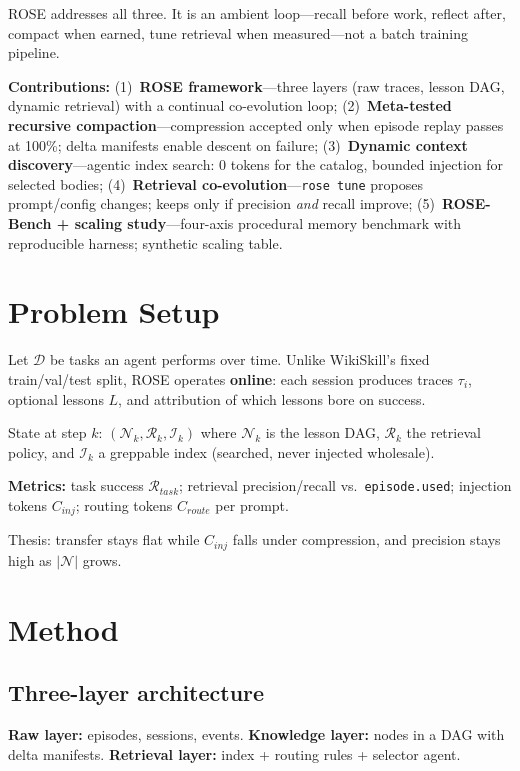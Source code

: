 \documentclass[11pt]{article}
\begin{document}
ROSE addresses all three.
It is an ambient loop---recall before work, reflect after, compact when earned, tune retrieval when measured---not a batch training pipeline.

\textbf{Contributions:}
(1)~\textbf{ROSE framework}---three layers (raw traces, lesson DAG, dynamic retrieval) with a continual co-evolution loop;
(2)~\textbf{Meta-tested recursive compaction}---compression accepted only when episode replay passes at 100\%; delta manifests enable descent on failure;
(3)~\textbf{Dynamic context discovery}---agentic index search: 0 tokens for the catalog, bounded injection for selected bodies;
(4)~\textbf{Retrieval co-evolution}---\texttt{rose tune} proposes prompt/config changes; keeps only if precision \emph{and} recall improve;
(5)~\textbf{ROSE-Bench + scaling study}---four-axis procedural memory benchmark with reproducible harness; synthetic scaling table.

\section{Problem Setup}
\label{sec:setup}

Let $\mathcal{D}$ be tasks an agent performs over time.
Unlike WikiSkill's fixed train/val/test split, ROSE operates \textbf{online}: each session produces traces $\tau_i$, optional lessons $L$, and attribution of which lessons bore on success.

State at step $k$: $(\mathcal{N}_k, \mathcal{R}_k, \mathcal{I}_k)$ where $\mathcal{N}_k$ is the lesson DAG, $\mathcal{R}_k$ the retrieval policy, and $\mathcal{I}_k$ a greppable index (searched, never injected wholesale).

\textbf{Metrics:} task success $\mathcal{R}_{task}$; retrieval precision/recall vs.\ \texttt{episode.used}; injection tokens $C_{inj}$; routing tokens $C_{route}$ per prompt.

Thesis: transfer stays flat while $C_{inj}$ falls under compression, and precision stays high as $|\mathcal{N}|$ grows.

\section{Method}
\label{sec:method}

\subsection{Three-layer architecture}

\textbf{Raw layer:} episodes, sessions, events.
\textbf{Knowledge layer:} nodes in a DAG with delta manifests.
\textbf{Retrieval layer:} index + routing rules + selector agent.
\end{document}
